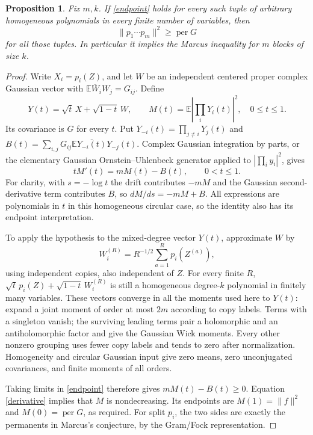 \documentclass[11pt]{article}
\newtheorem{proposition}{Proposition}
\newcommand{\per}{\operatorname{per}}
\begin{document}
\begin{proposition}
Fix $m,k$. If \eqref{endpoint} holds for every such tuple of arbitrary
homogeneous polynomials in every finite number of variables, then
\[
 \|p_1\cdots p_m\|^2\ge\per G
\]
for all those tuples. In particular it implies the Marcus inequality for
$m$ blocks of size $k$.
\end{proposition}
\begin{proof}
Write $X_i=p_i(Z)$, and let $W$ be an independent centered proper complex
Gaussian vector with $\mathbb E\overline W_iW_j=G_{ij}$. Define
\[
 Y(t)=\sqrt t\,X+\sqrt{1-t}\,W,\qquad
 M(t)=\mathbb E\left|\prod_iY_i(t)\right|^2,\quad 0\le t\le1.
\]
Its covariance is $G$ for every $t$. Put
$Y_{-i}(t)=\prod_{j\ne i}Y_j(t)$ and
$B(t)=\sum_{i,j}G_{ij}\mathbb E\overline{Y_{-i}(t)}Y_{-j}(t)$.
Complex Gaussian integration by parts, or the elementary Gaussian
Ornstein--Uhlenbeck generator applied to $|\prod_i y_i|^2$, gives
\begin{equation}\label{derivative}
 tM'(t)=mM(t)-B(t),\qquad 0<t\le1.
\end{equation}
For clarity, with $s=-\log t$ the drift contributes $-mM$ and the Gaussian
second-derivative term contributes $B$, so $dM/ds=-mM+B$.
All expressions are polynomials in $t$ in this homogeneous circular case,
so the identity also has its endpoint interpretation.

To apply the hypothesis to the mixed-degree vector $Y(t)$, approximate $W$
by
\[
 W_i^{(R)}=R^{-1/2}\sum_{a=1}^R p_i(Z^{(a)}),
\]
using independent copies, also independent of $Z$. For every finite $R$,
$\sqrt t\,p_i(Z)+\sqrt{1-t}\,W_i^{(R)}$ is still a homogeneous degree-$k$
polynomial in finitely many variables. These vectors converge in all the
moments used here to $Y(t)$: expand a joint moment of order at most $2m$
according to copy labels. Terms with a singleton vanish; the surviving
leading terms pair a holomorphic and an antiholomorphic factor and give
the Gaussian Wick moments. Every other nonzero grouping uses fewer copy
labels and tends to zero after normalization. Homogeneity and circular
Gaussian input give zero means, zero unconjugated covariances, and finite
moments of all orders.

Taking limits in \eqref{endpoint} therefore gives $mM(t)-B(t)\ge0$.
Equation \eqref{derivative} implies that $M$ is nondecreasing. Its endpoints
are $M(1)=\|f\|^2$ and $M(0)=\per G$, as required.
For split $p_i$, the two sides are exactly the permanents in Marcus's
conjecture, by the Gram/Fock representation.
\end{proof}
\end{document}
